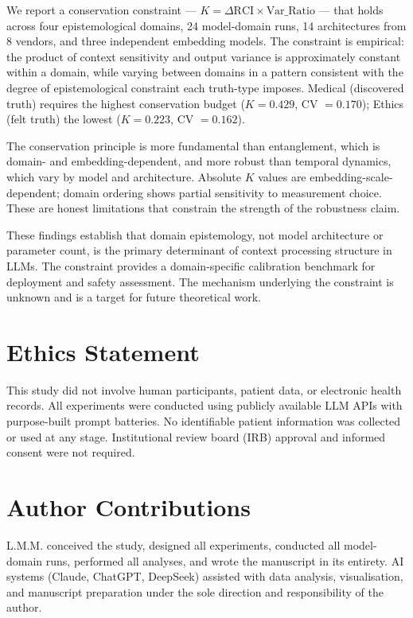 \documentclass[11pt,a4paper]{article}
\begin{document}
We report a conservation constraint --- $K = \Delta\text{RCI} \times \text{Var\_Ratio}$
--- that holds across four epistemological domains, 24 model-domain runs, 14
architectures from 8 vendors, and three independent embedding models. The constraint
is empirical: the product of context sensitivity and output variance is approximately
constant within a domain, while varying between domains in a pattern consistent with
the degree of epistemological constraint each truth-type imposes. Medical (discovered
truth) requires the highest conservation budget ($K = 0.429$, CV $= 0.170$); Ethics
(felt truth) the lowest ($K = 0.223$, CV $= 0.162$).

The conservation principle is more fundamental than entanglement, which is domain- and
embedding-dependent, and more robust than temporal dynamics, which vary by model and
architecture. Absolute $K$ values are embedding-scale-dependent; domain ordering shows
partial sensitivity to measurement choice. These are honest limitations that constrain
the strength of the robustness claim.

These findings establish that domain epistemology, not model architecture or parameter
count, is the primary determinant of context processing structure in LLMs. The
constraint provides a domain-specific calibration benchmark for deployment and safety
assessment. The mechanism underlying the constraint is unknown and is a target for
future theoretical work.

\section*{Ethics Statement}

This study did not involve human participants, patient data, or electronic health
records. All experiments were conducted using publicly available LLM APIs with
purpose-built prompt batteries. No identifiable patient information was collected
or used at any stage. Institutional review board (IRB) approval and informed consent
were not required.

\section*{Author Contributions}

L.M.M. conceived the study, designed all experiments, conducted all model-domain runs,
performed all analyses, and wrote the manuscript in its entirety. AI systems (Claude,
ChatGPT, DeepSeek) assisted with data analysis, visualisation, and manuscript
preparation under the sole direction and responsibility of the author.
\end{document}
